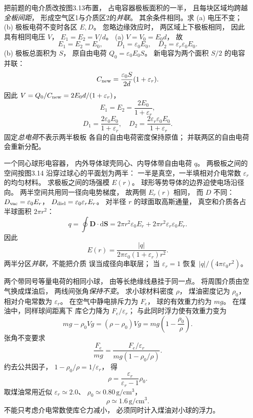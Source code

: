 把前题的电介质改按图3.13布置，
占电容器极板面积的一半，
且每块区域均跨越\emph{全板间距}，
形成空气区1与介质区2的\emph{并联}。
其余条件相同。求 (a) 电压不变；
(b) 极板电荷不变时各区 $E,D$。
\exsolution
忽略边缘效应时，
两区域上下极板相同，
因此具有相同电压 $V$，
$E_1=E_2=V/d$。
(a) $V=V_0=E_0d$，
故
\[
\boxed{E_1=E_2=E_0},\qquad
\boxed{D_1=\varepsilon_0E_0,\quad
D_2=\varepsilon_r\varepsilon_0E_0}.
\]
(b) 极板总面积为 $S$，
原自由电荷
$Q_0=\varepsilon_0E_0S$。
新电容为两个面积 $S/2$ 的电容并联：
\[
C_{\rm new}=\frac{\varepsilon_0S}{2d}
(1+\varepsilon_r).
\]
因此
$V=Q_0/C_{\rm new}
=2E_0d/(1+\varepsilon_r)$，
\[
\boxed{E_1=E_2=\frac{2E_0}{1+\varepsilon_r}},
\]
\[
\boxed{D_1=\frac{2\varepsilon_0E_0}{1+\varepsilon_r},
\quad
D_2=\frac{2\varepsilon_r\varepsilon_0E_0}
{1+\varepsilon_r}}.
\]
\excheck 固定\emph{总电荷}不表示两半极板
各自的自由电荷密度保持原值；
并联两区的自由电荷会重新分配。

一个同心球形电容器，
内外导体球壳同心、内导体带自由电荷 $q$。
两极板之间的空间按图3.14
沿穿过球心的平面划为两半：
一半是真空，一半填相对介电常数
$\varepsilon_r$ 的均匀材料。
求极板之间的场强模 $E(r)$。
\exsolution
球形等势导体的边界迫使电场沿径向。
两半空间共用同一径向电势梯度，
故两侧 $E_r(r)$ 相同，
而 $D$ 不同：
$D_{\rm vac}=\varepsilon_0 E_r$，
$D_{\rm diel}=\varepsilon_0\varepsilon_r E_r$。
对半径 $r$ 的球面取高斯通量，
真空和介质各占半球面积 $2\pi r^2$：
\[
q=\oint\bm D\cdot\mathrm d\bm S
=2\pi r^2\varepsilon_0E_r+
2\pi r^2\varepsilon_r\varepsilon_0E_r.
\]
因此
\[
\boxed{E(r)=
\frac{|q|}{2\pi\varepsilon_0(1+\varepsilon_r)r^2}}.
\]
\excheck 两半分区\emph{并联}，不能把介质
误当成径向串联层；
当 $\varepsilon_r=1$ 恢复
$|q|/(4\pi\varepsilon_0r^2)$。

两个带同号等量电荷的相同小球，
由等长绝缘线悬挂于同一点。
将周围介质由空气换成煤油后，
两线间张角\emph{保持不变}。
求小球材料密度 $\rho$，
煤油密度记为 $\rho_0$，
相对介电常数为 $\varepsilon_r$。
\exsolution
在空气中静电排斥力为 $F_e$，
球的有效重力约为 $mg$。
在煤油中，同样球间距离下
库仑力降为 $F_e/\varepsilon_r$；
与此同时浮力使有效重力变为
\[
mg-\rho_0Vg=(\rho-\rho_0)Vg
=mg\left(1-\frac{\rho_0}{\rho}\right).
\]
张角不变要求
\[
\frac{F_e}{mg}
=\frac{F_e/\varepsilon_r}
{mg(1-\rho_0/\rho)}.
\]
约去公共因子，
$1-\rho_0/\rho=1/\varepsilon_r$，
得
\[
\boxed{\rho=
\frac{\varepsilon_r}{\varepsilon_r-1}\rho_0}.
\]
取煤油常用近似
$\varepsilon_r\simeq2.0$、
$\rho_0\simeq0.80\,\mathrm{g/cm^3}$，
\[
\boxed{\rho\simeq1.6\,\mathrm{g/cm^3}}.
\]
\excheck 不能只考虑介电常数使库仑力减小，
必须同时计入煤油对小球的浮力。

